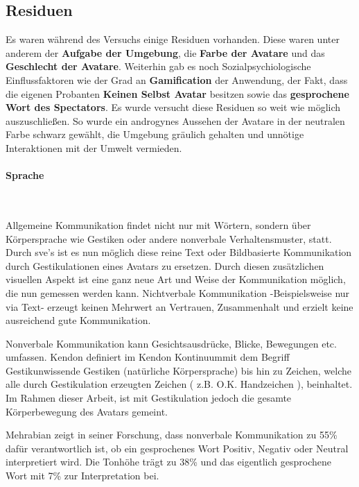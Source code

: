 \documentclass[a4paper,11pt]{article}%
\renewcommand{\\}{\vspace*{0.5\baselineskip} \newline}
\begin{document}
	\subsection{Residuen}
Es waren während des Versuchs einige Residuen vorhanden. Diese waren unter anderem der \textbf{Aufgabe der Umgebung}, die \textbf{Farbe der Avatare} und das \textbf{Geschlecht der Avatare}. Weiterhin gab es noch Sozialpsychiologische Einflussfaktoren wie der Grad an \textbf{Gamification} der Anwendung, der Fakt, dass die eigenen Probanten \textbf{Keinen Selbst Avatar} besitzen sowie das \textbf{gesprochene Wort des Spectators}.
Es wurde versucht diese Residuen so weit wie möglich auszuschließen. So wurde ein androgynes Aussehen der Avatare in der neutralen Farbe schwarz gewählt, die Umgebung gräulich gehalten und unnötige Interaktionen mit der Umwelt vermieden.
		
			
			\paragraph{Sprache} $~$ \\	
			
Allgemeine Kommunikation findet nicht nur mit Wörtern, sondern über Körpersprache wie Gestiken oder andere nonverbale Verhaltensmuster, statt. Durch \ac{sve}'s ist es nun möglich diese reine Text oder Bildbasierte Kommunikation durch Gestikulationen eines Avatars zu ersetzen. Durch diesen zusätzlichen visuellen Aspekt ist eine ganz neue Art und Weise der Kommunikation möglich, die nun gemessen werden kann. 
Nichtverbale Kommunikation -Beispielsweise nur via Text- erzeugt keinen Mehrwert an Vertrauen, Zusammenhalt und erzielt keine ausreichend gute Kommunikation. \citep[p.81]{haslam2003social}			

Nonverbale Kommunikation kann Gesichtsausdrücke, Blicke, Bewegungen etc. umfassen. Kendon definiert im \flqq Kendon Kontinuum\frqq mit dem Begriff \flqq Gestik\frqq unwissende Gestiken (natürliche Körpersprache) bis hin zu \frqq Zeichen\flqq, welche alle durch Gestikulation erzeugten Zeichen ( z.B. O.K. Handzeichen ), beinhaltet. \citep[37]{mcneill1992hand} 
Im Rahmen dieser Arbeit, ist mit Gestikulation jedoch die gesamte Körperbewegung des Avatars gemeint.

Mehrabian zeigt in seiner Forschung, dass nonverbale Kommunikation zu 55\% dafür verantwortlich ist, ob ein gesprochenes Wort Positiv, Negativ oder Neutral interpretiert wird. Die Tonhöhe trägt zu 38\% und das eigentlich gesprochene Wort mit 7\% zur Interpretation bei. \citep[43]{mehrabian1971silent}
\end{document}
